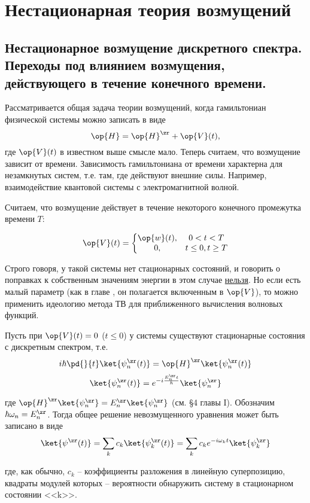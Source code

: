 \chapter{Нестационарная теория возмущений}

\section{Нестационарное возмущение дискретного спектра. Переходы под влиянием возмущения, действующего в течение конечного времени.}

Рассматривается общая задача теории возмущений, когда гамильтониан физической системы можно записать в виде
$$
\op{H} = \op{H}^\zr + \op{V}(t),
$$
где $\op{V}(t)$ в известном выше смысле мало. Теперь считаем, что возмущение зависит от времени. Зависимость гамильтониана от времени характерна для незамкнутых систем, т.е. там, где действуют внешние силы. Например, взаимодействие квантовой системы с электромагнитной волной.

Считаем, что возмущение действует в течение некоторого конечного промежутка времени $T$:

$$
\op{V}(t) = \left \{ 
  \begin{matrix}
    \op{w}(t), &  0 < t < T \\
    0, & t \le 0, t \ge T
  \end{matrix}
  \right .
$$

Строго говоря, у такой системы нет стационарных состояний, и говорить о поправках к собственным значениям энергии в этом случае \underline{нельзя}. Но если есть малый параметр (как в главе , он полагается включенным в $\op{V}$), то можно применить идеологию метода ТВ для приближенного вычисления волновых функций.

Пусть при $\op{V}(t) = 0$ ($t \le 0$) у системы существуют стационарные состояния с дискретным спектром, т.е.
$$
i \hbar \pd{}{t} \ket{\psi_n^\zr(t)} = \op{H}^\zr \ket{\psi_n^\zr(t)} 
$$
$$
\ket{\psi_n^\zr (t)} = e^{-i \frac{E_n^\zr t}{\hbar}} \ket{\psi_n^\zr}
$$

где $\op{H}^\zr \ket{\psi_n^\zr} = E_n^\zr \ket{\psi_n^\zr}$ (см. \S 4 главы I). Обозначим $\hbar \omega_n = E_n^\zr$. Тогда общее решение невозмущенного уравнения может быть записано в виде
$$
\ket{\psi^\zr(t)} = \sum_k c_k \ket{\psi_k^\zr (t)} = \sum_k c_k e^{-i \omega_k t} \ket{\psi_k^\zr}
$$

где, как обычно, $c_k$ -- коэффициенты разложения в линейную суперпозицию, квадраты модулей которых -- вероятности обнаружить систему в стационарном состоянии <<k>>.

